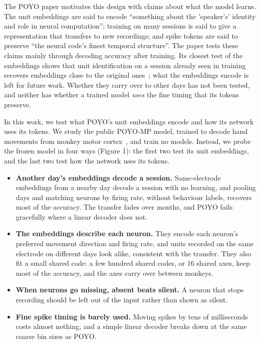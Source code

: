 \documentclass[11pt]{article}
\begin{document}
The POYO paper motivates this design with claims about what the model learns. The unit embeddings are said to encode ``something about the 'speaker's' identity and role in neural computation''; training on many sessions is said to give a representation that transfers to new recordings; and spike tokens are said to preserve ``the neural code's finest temporal structure''. The paper tests these claims mainly through decoding accuracy after training. Its closest test of the embeddings shows that unit identification on a session already seen in training recovers embeddings close to the original ones~\cite{ref1}; what the embeddings encode is left for future work. Whether they carry over to other days has not been tested, and neither has whether a trained model \emph{uses} the fine timing that its tokens preserve.

In this work, we test what POYO's unit embeddings encode and how its network uses its tokens. We study the public POYO-MP model, trained to decode hand movements from monkey motor cortex~\cite{ref3}, and train no models. Instead, we probe the frozen model in four ways (Figure 1): the first two test its unit embeddings, and the last two test how the network uses its tokens.

\begin{itemize}
\item \textbf{Another day's embeddings decode a session.} Same-electrode embeddings from a nearby day decode a session with no learning, and pooling days and matching neurons by firing rate, without behaviour labels, recovers most of the accuracy. The transfer fades over months, and POYO fails gracefully where a linear decoder does not.
\item \textbf{The embeddings describe each neuron.} They encode each neuron's preferred movement direction and firing rate, and units recorded on the same electrode on different days look alike, consistent with the transfer. They also fit a small shared code: a few hundred shared codes, or 16 shared axes, keep most of the accuracy, and the axes carry over between monkeys.
\item \textbf{When neurons go missing, absent beats silent.} A neuron that stops recording should be left out of the input rather than shown as silent.
\item \textbf{Fine spike timing is barely used.} Moving spikes by tens of milliseconds costs almost nothing, and a simple linear decoder breaks down at the same coarse bin sizes as POYO.
\end{itemize}
\end{document}
